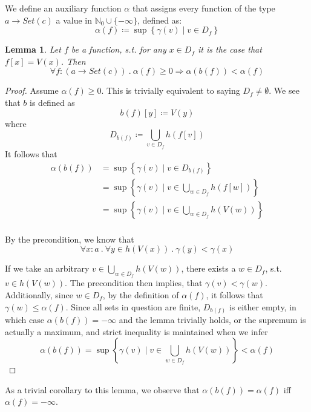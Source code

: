 \documentclass{article}
\newtheorem{lemma}[theorem]{Lemma}
\newcommand{\iteDef}[4]{
  #1 \coloneqq \left\{
\begin{array}{ll}
      #2 &; #3 \\
      #4 &; \text{otherwise}\\
\end{array} 
\right. 
}
\newcommand{\nat}{\mathbb N_0}
\newcommand{\op}{\textsc{Op}}
\begin{document}


We define an auxiliary function $\alpha$ that assigns every function of the type $a \to Set(c)$ a value in $\nat \cup \{-\infty\}$, defined as:
\[
\alpha(f) \coloneqq \sup\left\{ \gamma(v) \mid v \in D_f \right\}
\]

\begin{lemma}\label{lemma2}
Let $f$ be a function, s.t. for any $x \in D_f$ it is the case that $f[x] = V(x)$. Then
\[
\forall f\colon (a \to Set(c)) \ .\ \alpha(f) \ge 0 \Rightarrow \alpha(b(f)) < \alpha(f)
\]
\end{lemma}

\begin{proof}
Assume $\alpha(f) \ge 0$. This is trivially equivalent to saying $D_f \ne \emptyset$.
We see that $b$ is defined as
\[
b(f)[y] \coloneqq V(y)
\]
where 
\[
D_{b(f)} \coloneqq \bigcup_{v \in D_f} h(f[v])
\]
It follows that 
\begin{align*} 
\alpha(b(f)) &= \sup\left\{ \gamma(v) \mid v \in D_{b(f)} \right\} \\
&= \sup\left\{ \gamma(v) \mid v \in \bigcup_{w \in D_f} h(f[w]) \right\} \\
&= \sup\left\{ \gamma(v) \mid v \in \bigcup_{w \in D_f} h(V(w)) \right\} \\
\end{align*}

By the precondition, we know that 
\[
\forall x\colon a \ .\ \forall y \in h(V(x)) \ .\ \gamma(y) < \gamma(x) 
\]

If we take an arbitrary $v \in \bigcup_{w \in D_f} h(V(w))$, there exists a
$w \in D_f$, s.t. $v \in h(V(w))$. The precondition then implies, that $\gamma(v) < \gamma(w)$.
Additionally, since $w \in D_f$, by the definition of $\alpha(f)$, it follows that $\gamma(w) \le \alpha(f)$.
Since all sets in question are finite, $D_{b(f)}$ is either empty, in which case $\alpha(b(f)) = -\infty$ and the lemma trivially holds, or the supremum is actually a maximum, and strict inequality is maintained when we infer
\[
\alpha(b(f)) = \sup\left\{ \gamma(v) \mid v \in \bigcup_{w \in D_f} h(V(w)) \right\} < \alpha(f)
\]
\end{proof}
As a trivial corollary to this lemma, we observe that $\alpha(b(f)) = \alpha(f)$ iff $\alpha(f) = -\infty$.
\end{document}
